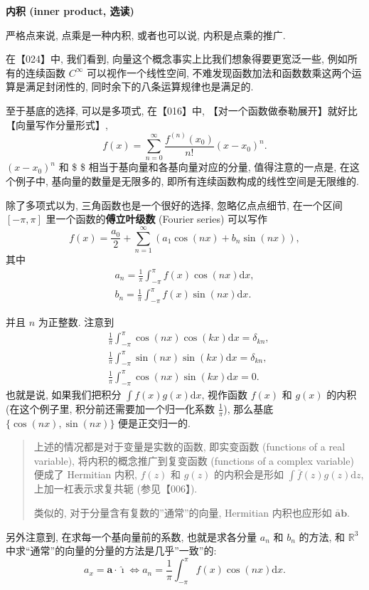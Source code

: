 \textbf{内积 (inner product, 选读)}

严格点来说, 点乘是一种内积, 或者也可以说, 内积是点乘的推广.

在【024】中, 我们看到, 向量这个概念事实上比我们想象得要更宽泛一些,
例如所有的连续函数 \(C^\infty\) 可以视作一个线性空间,
不难发现函数加法和函数数乘这两个运算是满足封闭性的,
同时余下的八条运算规律也是满足的.

至于基底的选择, 可以是多项式, 在【016】中,
【对一个函数做泰勒展开】就好比【向量写作分量形式】, \[
f(x)=\sum_{n=0}^\infty\frac{f^{(n)}(x_0)}{n!}(x-x_0)^n.
\] \((x-x_0)^n\) 和 \$ \$
相当于基向量和各基向量对应的分量, 值得注意的一点是, 在这个例子中,
基向量的数量是无限多的, 即所有连续函数构成的线性空间是无限维的.

除了多项式以为, 三角函数也是一个很好的选择, 忽略亿点点细节, 在一个区间
\([-\pi,\pi]\) 里一个函数的\textbf{傅立叶级数} (Fourier series) 可以写作
\[
f(x)=\frac{a_0}{2}+\sum_{n=1}^\infty\left(a_1\cos(nx)+b_n\sin(nx)\right),
\] 其中 \[
\begin{aligned}
a_n=\frac{1}{\pi}\int_{-\pi}^\pi f(x)\cos(nx)\mathrm{d}x,\\
b_n=\frac{1}{\pi}\int_{-\pi}^\pi f(x)\sin(nx)\mathrm{d}x.
\end{aligned}
\]

并且 \(n\) 为正整数. 注意到 \[
\begin{aligned}
&\frac{1}{\pi}\int_{-\pi}^{\pi}\cos(nx)\cos(kx)\mathrm{d}x=\delta_{kn},\\
&\frac{1}{\pi}\int_{-\pi}^{\pi}\sin(nx)\sin(kx)\mathrm{d}x=\delta_{kn},\\
&\frac{1}{\pi}\int _{-\pi}^{\pi}\cos(nx)\sin(kx)\mathrm{d}x=0.
\end{aligned}
\] 也就是说, 如果我们把积分 \(\int f(x)g(x)\mathrm{d}x\), 视作函数
\(f(x)\) 和 \(g(x)\) 的内积 (在这个例子里, 积分前还需要加一个归一化系数
\(\frac{1}{\pi}\)), 那么基底 \(\{\cos(nx),\sin(nx)\}\) 便是正交归一的.

\begin{quote}
上述的情况都是对于变量是实数的函数, 即实变函数 (functions of a real
variable), 将内积的概念推广到复变函数 (functions of a complex variable)
便成了 Hermitian 内积, \(f(z)\) 和 \(g(z)\) 的内积会是形如
\(\int\bar{f}(z)g(z)\mathrm{d}z\), 上加一杠表示求复共轭 (参见【006】).

类似的, 对于分量含有复数的''通常''的向量, Hermitian 内积也应形如
\(\bar{\boldsymbol{a}}\boldsymbol{b}\).
\end{quote}

另外注意到, 在求每一个基向量前的系数, 也就是求各分量 \(a_n\) 和 \(b_n\)
的方法, 和 \(\mathbb{R}^3\)
中求``通常''的向量的分量的方法是几乎''一致''的: \[
a_x=\boldsymbol{a}\cdot\hat{\imath}\Leftrightarrow a_n=\frac{1}{\pi}\int_{-\pi}^\pi f(x)\cos(nx)\mathrm{d}x.
\]

